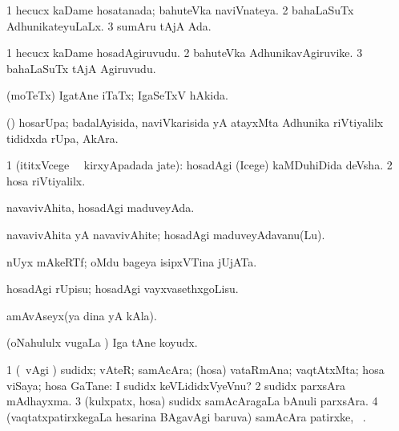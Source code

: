 \bentry
{}
\gl{\gu}
\bmng
\bnum
\num{1} hecucx kaDame hosatanada; bahuteVka naviVnateya. 
\num{2} bahaLaSuTx AdhunikateyuLaLx. 
\num{3} sumAru tAjA Ada. 
\enum
\emng
\eentry

\bentry
{}
\gl{\nA}
\bmng
\bnum
\num{1} hecucx kaDame hosadAgiruvudu. 
\num{2} bahuteVka AdhunikavAgiruvike. 
\num{3} bahaLaSuTx tAjA Agiruvudu. 
\enum
\emng
\eentry

\bentry
{}
\gl{\gu}
\bmng
(moTeTx) IgatAne iTaTx; IgaSeTxV hAkida. 
\emng
\eentry

\bentry
{}
\gl{\nA}
\bmng
(\AmA) hosarUpa; badalAyisida, naviVkarisida yA atayxMta Adhunika riVtiyalilx tididxda rUpa, AkAra. 
\emng
\eentry

\bentry
{}
\gl{\kirxvi}
\bmng
\bnum
\num{1} (ititxVcege \sA\ \BUkaq\ kirxyApadada jate):  hosadAgi (Icege) kaMDuhiDida deVsha. 
\num{2} hosa riVtiyalilx. 
\enum
\emng
\eentry

\bentry
{}
\gl{\gu}
\bmng
navavivAhita, hosadAgi maduveyAda. 
\emng
\eentry

\bentry
{}
\gl{\nA}
\bmng
navavivAhita yA navavivAhite; hosadAgi maduveyAdavanu(Lu). 
\emng
\eentry

\bentry
{}
\gl{\nA}
\bmng
nUyx mAkeRTf; oMdu bageya isipxVTina jUjATa. 
\emng
\eentry

\bentry
{}
\gl{\sakirx}
\bmng
hosadAgi rUpisu; hosadAgi vayxvasethxgoLisu. 
\emng
\eentry

\bentry
{}
\gl{\nA}
\bmng
amAvAseyx(ya dina yA kAla). 
\emng
\eentry

\bentry
{}
\gl{\gu}
\bmng
(oNahululx \mo vugaLa \vi) Iga tAne koyudx. 
\emng
\eentry

\bentry
{}
\gl{\nA}
\bmng
\bnum
\num{1} (\sA\ \Eva vAgi \parx) sudidx; vAteR; samAcAra; (hosa) vataRmAna; vaqtAtxMta; hosa viSaya; hosa GaTane: I sudidx keVLididxVyeVnu? 
\num{2} sudidx parxsAra mAdhayxma. 
\num{3} (kulxpatx, hosa) sudidx samAcAragaLa bAnuli parxsAra. 
\num{4} (vaqtatxpatirxkegaLa hesarina BAgavAgi baruva) samAcAra patirxke, \udA\ . 
\enum
\emng

